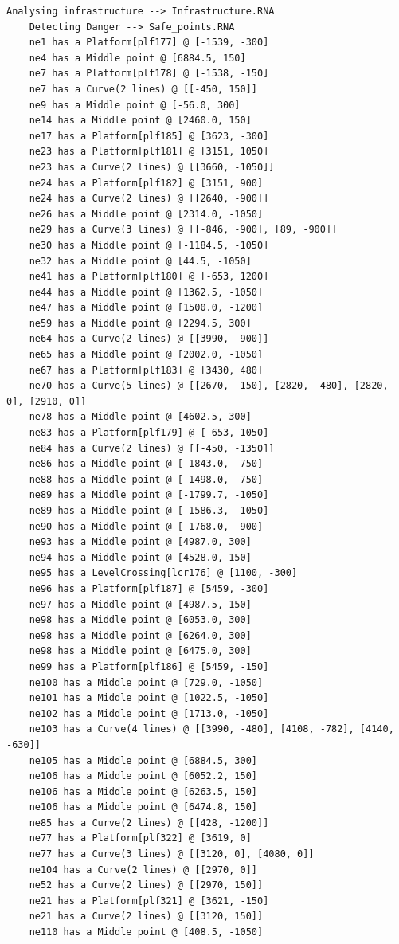 	\begin{lstlisting}[language = {}, tabsize=4, basicstyle=\footnotesize\ttfamily, showspaces=false, showstringspaces=false, caption = Detección de puntos críticos por parte del RNA , label = {lst:EJ3_2}]
	Analysing infrastructure --> Infrastructure.RNA
	Detecting Danger --> Safe_points.RNA
	ne1 has a Platform[plf177] @ [-1539, -300]
	ne4 has a Middle point @ [6884.5, 150]
	ne7 has a Platform[plf178] @ [-1538, -150]
	ne7 has a Curve(2 lines) @ [[-450, 150]]
	ne9 has a Middle point @ [-56.0, 300]
	ne14 has a Middle point @ [2460.0, 150]
	ne17 has a Platform[plf185] @ [3623, -300]
	ne23 has a Platform[plf181] @ [3151, 1050]
	ne23 has a Curve(2 lines) @ [[3660, -1050]]
	ne24 has a Platform[plf182] @ [3151, 900]
	ne24 has a Curve(2 lines) @ [[2640, -900]]
	ne26 has a Middle point @ [2314.0, -1050]
	ne29 has a Curve(3 lines) @ [[-846, -900], [89, -900]]
	ne30 has a Middle point @ [-1184.5, -1050]
	ne32 has a Middle point @ [44.5, -1050]
	ne41 has a Platform[plf180] @ [-653, 1200]
	ne44 has a Middle point @ [1362.5, -1050]
	ne47 has a Middle point @ [1500.0, -1200]
	ne59 has a Middle point @ [2294.5, 300]
	ne64 has a Curve(2 lines) @ [[3990, -900]]
	ne65 has a Middle point @ [2002.0, -1050]
	ne67 has a Platform[plf183] @ [3430, 480]
	ne70 has a Curve(5 lines) @ [[2670, -150], [2820, -480], [2820, 0], [2910, 0]]
	ne78 has a Middle point @ [4602.5, 300]
	ne83 has a Platform[plf179] @ [-653, 1050]
	ne84 has a Curve(2 lines) @ [[-450, -1350]]
	ne86 has a Middle point @ [-1843.0, -750]
	ne88 has a Middle point @ [-1498.0, -750]
	ne89 has a Middle point @ [-1799.7, -1050]
	ne89 has a Middle point @ [-1586.3, -1050]
	ne90 has a Middle point @ [-1768.0, -900]
	ne93 has a Middle point @ [4987.0, 300]
	ne94 has a Middle point @ [4528.0, 150]
	ne95 has a LevelCrossing[lcr176] @ [1100, -300]
	ne96 has a Platform[plf187] @ [5459, -300]
	ne97 has a Middle point @ [4987.5, 150]
	ne98 has a Middle point @ [6053.0, 300]
	ne98 has a Middle point @ [6264.0, 300]
	ne98 has a Middle point @ [6475.0, 300]
	ne99 has a Platform[plf186] @ [5459, -150]
	ne100 has a Middle point @ [729.0, -1050]
	ne101 has a Middle point @ [1022.5, -1050]
	ne102 has a Middle point @ [1713.0, -1050]
	ne103 has a Curve(4 lines) @ [[3990, -480], [4108, -782], [4140, -630]]
	ne105 has a Middle point @ [6884.5, 300]
	ne106 has a Middle point @ [6052.2, 150]
	ne106 has a Middle point @ [6263.5, 150]
	ne106 has a Middle point @ [6474.8, 150]
	ne85 has a Curve(2 lines) @ [[428, -1200]]
	ne77 has a Platform[plf322] @ [3619, 0]
	ne77 has a Curve(3 lines) @ [[3120, 0], [4080, 0]]
	ne104 has a Curve(2 lines) @ [[2970, 0]]
	ne52 has a Curve(2 lines) @ [[2970, 150]]
	ne21 has a Platform[plf321] @ [3621, -150]
	ne21 has a Curve(2 lines) @ [[3120, 150]]
	ne110 has a Middle point @ [408.5, -1050]
	\end{lstlisting}
	
